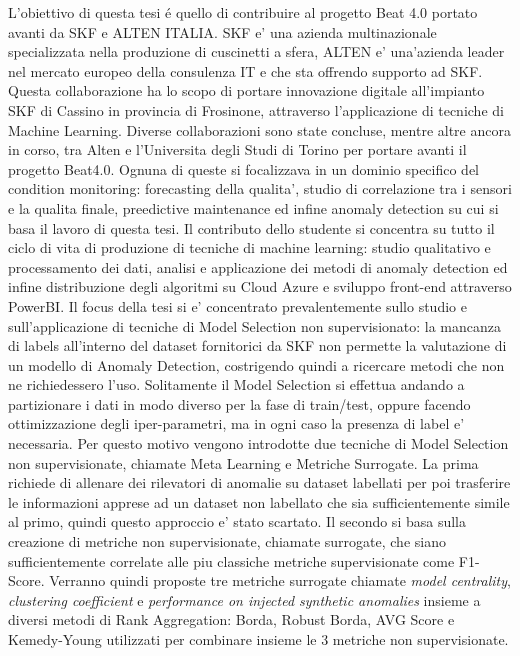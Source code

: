L’obiettivo di questa tesi é quello di contribuire al progetto Beat 4.0 portato avanti da SKF e ALTEN ITALIA. SKF e' una azienda multinazionale specializzata nella produzione di cuscinetti a sfera, ALTEN e' una'azienda leader nel mercato europeo della consulenza IT e che sta offrendo supporto ad SKF. Questa collaborazione ha lo scopo di portare innovazione digitale all'impianto SKF di Cassino in provincia di Frosinone, attraverso l'applicazione di tecniche di Machine Learning.
Diverse collaborazioni sono state concluse, mentre altre ancora in corso, tra Alten e l'Universita degli Studi di Torino per portare avanti il progetto Beat4.0. Ognuna di queste si focalizzava in un dominio specifico del condition monitoring: forecasting della qualita', studio di correlazione tra i sensori e la qualita finale, preedictive maintenance ed infine anomaly detection su cui si basa il lavoro di questa tesi.
Il contributo dello studente si concentra su tutto il ciclo di vita di produzione di tecniche di machine learning: studio qualitativo e processamento dei dati, analisi e applicazione dei metodi di anomaly detection ed infine distribuzione degli algoritmi su Cloud Azure e sviluppo front-end attraverso PowerBI.
Il focus della tesi si e' concentrato prevalentemente sullo studio e sull'applicazione di tecniche di Model Selection non supervisionato: la mancanza di labels all'interno del dataset fornitorici da SKF non permette la valutazione di un modello di Anomaly Detection, costrigendo quindi a ricercare metodi che non ne richiedessero l'uso. Solitamente il Model Selection si effettua andando a partizionare i dati in modo diverso per la fase di train/test, oppure facendo ottimizzazione degli iper-parametri, ma in ogni caso la presenza di label e' necessaria. Per questo motivo vengono introdotte due tecniche di Model Selection non supervisionate, chiamate Meta Learning e Metriche Surrogate. La prima richiede di allenare dei rilevatori di anomalie su dataset labellati per poi trasferire le informazioni apprese ad un dataset non labellato che sia sufficientemente simile al primo, quindi questo approccio e' stato scartato. Il secondo si basa sulla creazione di metriche non supervisionate, chiamate surrogate, che siano sufficientemente correlate alle piu classiche metriche supervisionate come F1-Score. Verranno quindi proposte tre metriche surrogate chiamate \textit{model centrality}, \textit{clustering coefficient} e \textit{performance on injected synthetic anomalies} insieme a diversi metodi di Rank Aggregation: Borda, Robust Borda, AVG Score e Kemedy-Young utilizzati per combinare insieme le 3 metriche non supervisionate.

